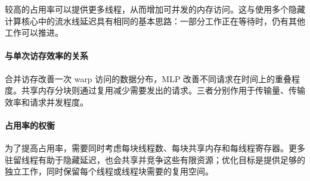 较高的占用率可以提供更多线程，从而增加可并发的内存访问。这与使用多个隐藏计算核心中的流水线延迟具有相同的基本思路：一部分工作正在等待时，仍有其他工作可以推进。

\paragraph{与单次访存效率的关系}
合并访存改善一次 warp 访问的数据分布，MLP 改善不同请求在时间上的重叠程度。共享内存分块则通过复用减少需要发出的请求。三者分别作用于传输量、传输效率和请求并发程度。

\paragraph{占用率的权衡}
为了提高占用率，需要同时考虑每块线程数、每块共享内存和每线程寄存器。更多驻留线程有助于隐藏延迟，也会共享并竞争这些有限资源；优化目标是提供足够的独立工作，同时保留每个线程或线程块需要的复用空间。
\FloatBarrier

